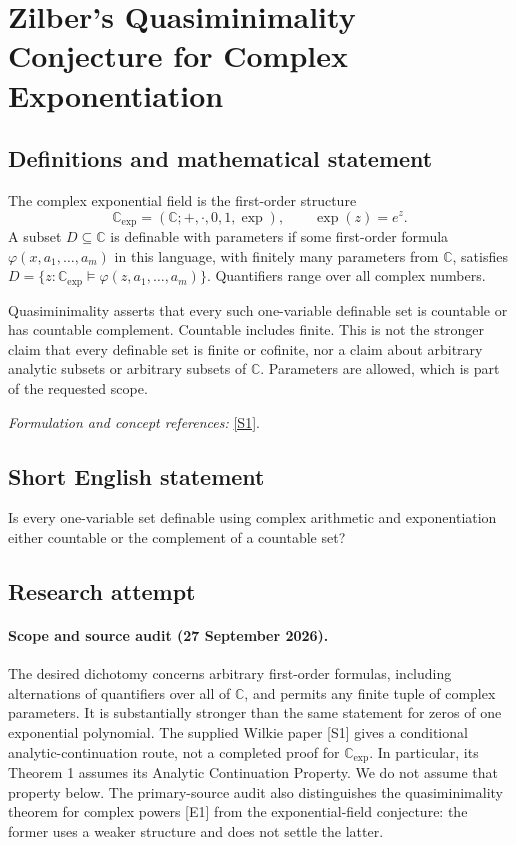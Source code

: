 \documentclass[11pt]{article}
\begin{document}
\section*{\texorpdfstring{Zilber’s Quasiminimality Conjecture for Complex Exponentiation}{Zilber’s Quasiminimality Conjecture for Complex Exponentiation}}\label{statement}
\subsection{Definitions and mathematical statement}
The complex exponential field is the first-order structure
\[
 {\mathbb{C}}_{\exp}=({\mathbb{C}};+ ,\cdot,0,1,\exp),\qquad \exp(z)=e^z.
\]
A subset $D\subseteq{\mathbb{C}}$ is definable with parameters if some first-order formula $\varphi(x,a_1,\ldots,a_m)$ in this language, with finitely many parameters from ${\mathbb{C}}$, satisfies $D=\{z:{\mathbb{C}}_{\exp}\models\varphi(z,a_1,\ldots,a_m)\}$. Quantifiers range over all complex numbers.

Quasiminimality asserts that every such one-variable definable set is countable or has countable complement. Countable includes finite. This is not the stronger claim that every definable set is finite or cofinite, nor a claim about arbitrary analytic subsets or arbitrary subsets of ${\mathbb{C}}$. Parameters are allowed, which is part of the requested scope.
\par\smallskip\textit{Formulation and concept references:} \href{https://arxiv.org/pdf/2306.14562v1}{[S1]}.

\subsection{Short English statement}
Is every one-variable set definable using complex arithmetic and exponentiation either countable or the complement of a countable set?
\subsection{Research attempt}

\paragraph{Scope and source audit (27 September 2026).}
The desired dichotomy concerns arbitrary first-order formulas, including
alternations of quantifiers over all of $\mathbb C$, and permits any finite
tuple of complex parameters. It is substantially stronger than the same
statement for zeros of one exponential polynomial. The supplied Wilkie
paper [S1] gives a conditional analytic-continuation route, not a completed
proof for $\mathbb C_{\exp}$. In particular, its Theorem 1 assumes its
Analytic Continuation Property. We do not assume that property below.
The primary-source audit also distinguishes the quasiminimality theorem
for complex powers [E1] from the exponential-field conjecture: the former
uses a weaker structure and does not settle the latter.
\end{document}
